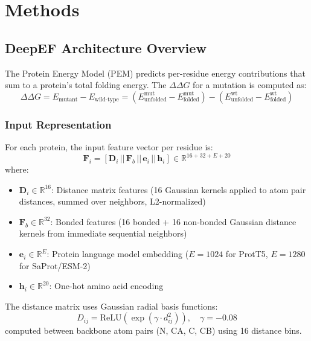 \chapter{Methods}
\label{ch:methods}

\section{DeepEF Architecture Overview}

The Protein Energy Model (PEM) predicts per-residue energy contributions that sum to a protein's total folding energy. The $\Delta\Delta G$ for a mutation is computed as:
\begin{equation}
    \Delta\Delta G = E_{\text{mutant}} - E_{\text{wild-type}} = (E_{\text{unfolded}}^{\text{mut}} - E_{\text{folded}}^{\text{mut}}) - (E_{\text{unfolded}}^{\text{wt}} - E_{\text{folded}}^{\text{wt}})
\end{equation}

\subsection{Input Representation}

For each protein, the input feature vector per residue is:
\begin{equation}
    \mathbf{F}_i = [\mathbf{D}_i \,||\, \mathbf{F}_b \,||\, \mathbf{e}_i \,||\, \mathbf{h}_i] \in \mathbb{R}^{16 + 32 + E + 20}
\end{equation}
where:
\begin{itemize}
    \item $\mathbf{D}_i \in \mathbb{R}^{16}$: Distance matrix features (16 Gaussian kernels applied to atom pair distances, summed over neighbors, L2-normalized)
    \item $\mathbf{F}_b \in \mathbb{R}^{32}$: Bonded features (16 bonded + 16 non-bonded Gaussian distance kernels from immediate sequential neighbors)
    \item $\mathbf{e}_i \in \mathbb{R}^{E}$: Protein language model embedding ($E = 1024$ for ProtT5, $E = 1280$ for SaProt/ESM-2)
    \item $\mathbf{h}_i \in \mathbb{R}^{20}$: One-hot amino acid encoding
\end{itemize}

The distance matrix uses Gaussian radial basis functions:
\begin{equation}
    D_{ij} = \text{ReLU}\left(\exp(\gamma \cdot d_{ij}^2)\right), \quad \gamma = -0.08
\end{equation}
computed between backbone atom pairs (N, CA, C, CB) using 16 distance bins.

